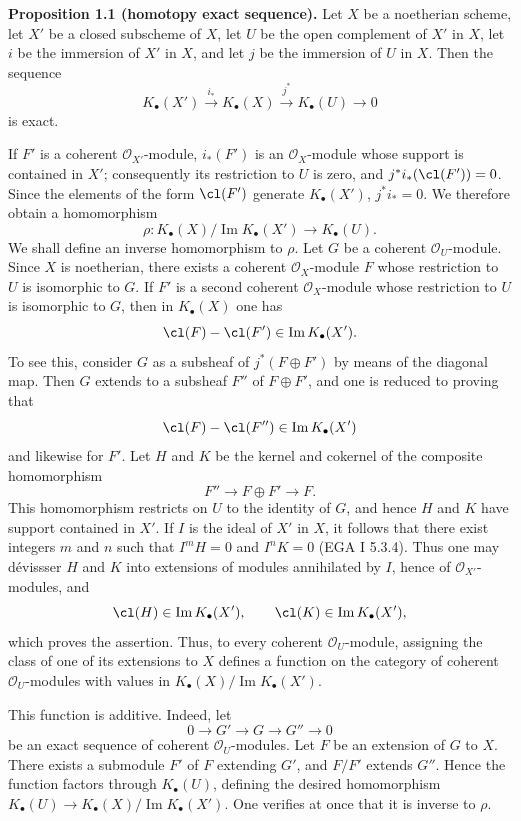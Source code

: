 \textbf{Proposition 1.1 (homotopy exact sequence).} Let $X$ be a noetherian scheme, let $X'$ be a closed subscheme of $X$, let $U$ be the open complement of $X'$ in $X$, let $i$ be the immersion of $X'$ in $X$, and let $j$ be the immersion of $U$ in $X$. Then the sequence
\[
 K_\bullet(X')\xrightarrow{i_*}K_\bullet(X)\xrightarrow{j^*}K_\bullet(U)\longrightarrow 0
\]
is exact.

If $F'$ is a coherent $\mathcal O_{X'}$-module, $i_*(F')$ is an $\mathcal O_X$-module whose support is contained in $X'$; consequently its restriction to $U$ is zero, and $j^*i_*(\cl(F'))=0$. Since the elements of the form $\cl(F')$ generate $K_\bullet(X')$, $j^*i_*=0$. We therefore obtain a homomorphism
\[
 \rho:K_\bullet(X)/\operatorname{Im}K_\bullet(X')\longrightarrow K_\bullet(U).
\]
We shall define an inverse homomorphism to $\rho$. Let $G$ be a coherent $\mathcal O_U$-module. Since $X$ is noetherian, there exists a coherent $\mathcal O_X$-module $F$ whose restriction to $U$ is isomorphic to $G$. If $F'$ is a second coherent $\mathcal O_X$-module whose restriction to $U$ is isomorphic to $G$, then in $K_\bullet(X)$ one has
\[
 \cl(F)-\cl(F')\in \operatorname{Im}K_\bullet(X').
\]
To see this, consider $G$ as a subsheaf of $j^*(F\oplus F')$ by means of the diagonal map. Then $G$ extends to a subsheaf $F''$ of $F\oplus F'$, and one is reduced to proving that
\[
 \cl(F)-\cl(F'')\in \operatorname{Im}K_\bullet(X')
\]
and likewise for $F'$. Let $H$ and $K$ be the kernel and cokernel of the composite homomorphism
\[
 F''\longrightarrow F\oplus F'\longrightarrow F.
\]
This homomorphism restricts on $U$ to the identity of $G$, and hence $H$ and $K$ have support contained in $X'$. If $I$ is the ideal of $X'$ in $X$, it follows that there exist integers $m$ and $n$ such that $I^mH=0$ and $I^nK=0$ (EGA I 5.3.4). Thus one may dévissser $H$ and $K$ into extensions of modules annihilated by $I$, hence of $\mathcal O_{X'}$-modules, and
\[
 \cl(H)\in\operatorname{Im}K_\bullet(X'),\qquad \cl(K)\in\operatorname{Im}K_\bullet(X'),
\]
which proves the assertion. Thus, to every coherent $\mathcal O_U$-module, assigning the class of one of its extensions to $X$ defines a function on the category of coherent $\mathcal O_U$-modules with values in $K_\bullet(X)/\operatorname{Im}K_\bullet(X')$.

This function is additive. Indeed, let
\[
0\longrightarrow G'\longrightarrow G\longrightarrow G''\longrightarrow 0
\]
be an exact sequence of coherent $\mathcal O_U$-modules. Let $F$ be an extension of $G$ to $X$. There exists a submodule $F'$ of $F$ extending $G'$, and $F/F'$ extends $G''$. Hence the function factors through $K_\bullet(U)$, defining the desired homomorphism $K_\bullet(U)\to K_\bullet(X)/\operatorname{Im}K_\bullet(X')$. One verifies at once that it is inverse to $\rho$.

